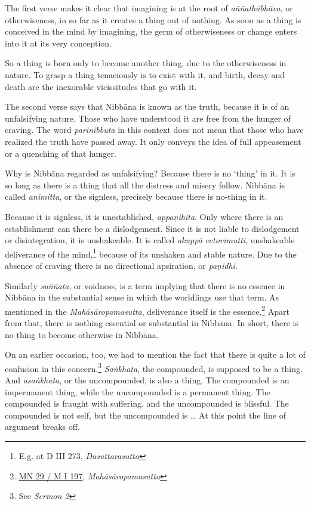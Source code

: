 The first verse makes it clear that imagining is at the root of \emph{aññathābhāva}, or otherwiseness, in so far as it creates a thing out of nothing. As soon as a thing is conceived in the mind by imagining, the germ of otherwiseness or change enters into it at its very conception.

So a thing is born only to become another thing, due to the otherwiseness in nature. To grasp a thing tenaciously is to exist with it, and birth, decay and death are the inexorable vicissitudes that go with it.

The second verse says that Nibbāna is known as the truth, because it is of an unfalsifying nature. Those who have understood it are free from the hunger of craving. The word \emph{parinibbuta} in this context does not mean that those who have realized the truth have passed away. It only conveys the idea of full appeasement or a quenching of that hunger.

Why is Nibbāna regarded as unfalsifying? Because there is no `thing' in it. It is so long as there is a thing that all the distress and misery follow. Nibbāna is called \emph{animitta}, or the signless, precisely because there is no-thing in it.

Because it is signless, it is unestablished, \emph{appaṇihita}. Only where there is an establishment can there be a dislodgement. Since it is not liable to dislodgement or disintegration, it is unshakeable. It is called \emph{akuppā cetovimutti}, unshakeable deliverance of the mind,\footnote{E.g. at D III 273, \emph{Dasuttarasutta}} because of its unshaken and stable nature. Due to the absence of craving there is no directional apsiration, or \emph{paṇidhi}.

Similarly \emph{suññata}, or voidness, is a term implying that there is no essence in Nibbāna in the substantial sense in which the worldlings use that term. As mentioned in the \emph{Mahāsāropamasutta}, deliverance itself is the essence.\footnote{\href{https://suttacentral.net/mn29/pli/ms}{MN 29 / M I 197}, \emph{Mahāsāropamasutta}} Apart from that, there is nothing essential or substantial in Nibbāna. In short, there is no thing to become otherwise in Nibbāna.

On an earlier occasion, too, we had to mention the fact that there is quite a lot of confusion in this concern.\footnote{See \emph{Sermon 2}} \emph{Saṅkhata}, the compounded, is supposed to be a thing. And \emph{asaṅkhata}, or the uncompounded, is also a thing. The compounded is an impermanent thing, while the uncompounded is a permanent thing. The compounded is fraught with suffering, and the uncompounded is blissful. The compounded is not self, but the uncompounded is \ldots{} At this point the line of argument breaks off.

